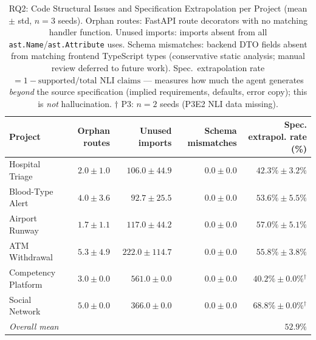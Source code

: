 \begin{table}[t]
\centering
\caption{RQ2: Code Structural Issues and Specification Extrapolation per Project (mean $\pm$ std, $n=3$ seeds). Orphan routes: FastAPI route decorators with no matching handler function. Unused imports: imports absent from all \texttt{ast.Name}/\texttt{ast.Attribute} uses. Schema mismatches: backend DTO fields absent from matching frontend TypeScript types (conservative static analysis; manual review deferred to future work). Spec.\ extrapolation rate $= 1 - \text{supported}/\text{total NLI claims}$ — measures how much the agent generates \emph{beyond} the source specification (implied requirements, defaults, error copy); this is \emph{not} hallucination. $\dagger$ P3: $n=2$ seeds (P3E2 NLI data missing).}
\label{tab:rq2_hallucination}
\renewcommand{\arraystretch}{1.15}
\begin{tabular}{@{}lrrrr@{}}
\toprule
\textbf{Project} & \textbf{Orphan routes} & \textbf{Unused imports} & \textbf{Schema mismatches} & \textbf{Spec. extrapol. rate (\%)} \\
\midrule
\rowcolor[HTML]{E8F4FF} Hospital Triage & $2.0 \pm 1.0$ & $106.0 \pm 44.9$ & $0.0 \pm 0.0$ & $42.3\% \pm 3.2\%$ \\
\rowcolor[HTML]{E8F5E8} Blood-Type Alert & $4.0 \pm 3.6$ & $92.7 \pm 25.5$ & $0.0 \pm 0.0$ & $53.6\% \pm 5.5\%$ \\
\rowcolor[HTML]{FEF7E0} Airport Runway & $1.7 \pm 1.1$ & $117.0 \pm 44.2$ & $0.0 \pm 0.0$ & $57.0\% \pm 5.1\%$ \\
\rowcolor[HTML]{F8EAF2} ATM Withdrawal & $5.3 \pm 4.9$ & $222.0 \pm 114.7$ & $0.0 \pm 0.0$ & $55.8\% \pm 3.8\%$ \\
\rowcolor[HTML]{EAF0FF} Competency Platform & $3.0 \pm 0.0$ & $561.0 \pm 0.0$ & $0.0 \pm 0.0$ & $40.2\% \pm 0.0\%$$^\dagger$ \\
\rowcolor[HTML]{FFF5E0} Social Network & $5.0 \pm 0.0$ & $366.0 \pm 0.0$ & $0.0 \pm 0.0$ & $68.8\% \pm 0.0\%$$^\dagger$ \\
\midrule
\textit{Overall mean} & & & & $\mathbf{52.9\%}$ \\
\bottomrule
\end{tabular}
\end{table}
